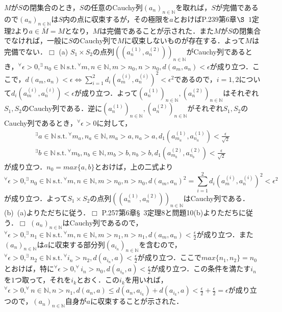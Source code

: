 ﻿\documentclass[11pt,a4paper]{jsarticle}
\newcommand{\st}{\mathrm{s.t.}\,}  %
\def\qed{\hfill $\Box$}
\begin{document}
%
\prob
$M$が$S$の閉集合のとき，$S$の任意のCauchy列$(a_n)_{n \in \mathbb{N}}$を取れば，$S$が完備であるので$(a_n)_{n \in \mathbb{N}}$は$S$内の点に収束するが，その極限を$a$とおけばP.239第$6$章$\S${\ }$1$定理$2$より$a \in \overline{M}=M$となり，$M$は完備であることが示された．また$M$が$S$の閉集合でなければ，一般に$S$のCauchy列で$M$に収束しないものが存在する．よって$M$は完備でない．\qed
%
\prob(a)
$S_1 \times S_2$の点列$((a_n^{(1)},a_n^{(2)}))_{n \in \mathbb{N}}$がCauchy列であるとき，$^\forall \epsilon>0, ^\exists n_0 \in \mathbb{N}{\ }\st ^\forall m,n \in \mathbb{N},m>n_0,n>n_0,d(a_m,a_n)<\epsilon$が成り立つ．ここで，$\displaystyle d(a_m,a_n)<\epsilon \Leftrightarrow \sum_{i=1}^2 d_i(a_m^{(i)},a_n^{(i)})^2<\epsilon^2$であるので，$i=1,2$について$d_i(a_m^{(i)},a_n^{(i)})<\epsilon$が成り立つ．よって$(a_n^{(1)})_{n \in \mathbb{N}},(a_n^{(2)})_{n \in \mathbb{N}}$はそれぞれ$S_1,S_2$のCauchy列である．逆に$(a_n^{(1)})_{n \in \mathbb{N}},(a_n^{(2)})_{n \in \mathbb{N}}$がそれぞれ$S_1,S_2$のCauchy列であるとき，$^\forall \epsilon>0$に対して，
\begin{eqnarray*}
^\exists a \in \mathbb{N}{\ }\st ^\forall m_a,n_a \in \mathbb{N},m_a>a,n_a>a,d_1(a_{m_a}^{(1)},a_{n_a}^{(1)})<\frac{\epsilon}{\sqrt{2}} \\
^\exists b \in \mathbb{N}{\ }\st ^\forall m_b,n_b \in \mathbb{N},m_b>b,n_b>b,d_1(a_{m_b}^{(2)},a_{n_b}^{(2)})<\frac{\epsilon}{\sqrt{2}}
\end{eqnarray*}
が成り立つ．$n_0=max\{a,b\}$とおけば，上の二式より
\begin{equation*}
^\forall \epsilon>0, ^\exists n_0 \in \mathbb{N}{\ }\st ^\forall m,n \in \mathbb{N},m>n_0,n>n_0,d(a_m,a_n)^2=\sum_{i=1}^2 d_i(a_m^{(i)},a_n^{(i)})^2<\epsilon^2
\end{equation*}
が成り立つ．よって$S_1 \times S_2$の点列$((a_n^{(1)},a_n^{(2)}))_{n \in \mathbb{N}}$はCauchy列である．\\
(b){\ }(a)よりただちに従う．\qed
%
\prob
P.257第6章{\S}{\ }3定理8と問題10(b)よりただちに従う．\qed
%
\prob
$(a_n)_{n \in \mathbb{N}}$はCauchy列であるので，$^\forall\epsilon>0, ^\exists n_1 \in \mathbb{N}{\ } \st ^\forall m,n \in \mathbb{N}, m>n_1,n>n_1,d(a_m,a_n)<\frac{\epsilon}{2}$が成り立つ．また$(a_n)_{n \in \mathbb{N}}$は$a$に収束する部分列$(a_{i_n})_{n \in \mathbb{N}}$を含むので，$^\forall\epsilon>0, ^\exists n_2 \in \mathbb{N}{\ } \st ^\forall i_n>n_2,d(a_{i_n},a)<\frac{\epsilon}{2}$が成り立つ．ここで$max\{n_1,n_2\}=n_0$とおけば，特に$^\forall\epsilon>0, ^\forall i_n>n_0,d(a_{i_n},a)<\frac{\epsilon}{2}$が成り立つ．この条件を満たす$i_n$を$1$つ取って，それを$i_k$とおく．この$i_k$を用いれば，$^\forall\epsilon>0, ^\forall n \in \mathbb{N}, n>n_1,d(a_n,a) \leq d(a_n,a_{i_k})+d(a_{i_k},a)<\frac{\epsilon}{2}+\frac{\epsilon}{2}=\epsilon$が成り立つので，$(a_n)_{n \in \mathbb{N}}$自身が$a$に収束することが示された．
\end{document}
